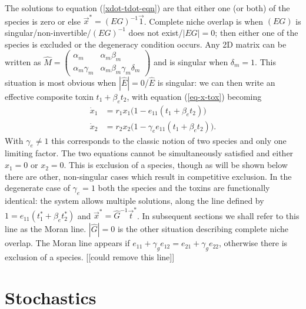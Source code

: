 \documentclass[a4paper,11pt]{article}
\numberwithin{equation}{section} %
\begin{document}
The solutions to equation (\ref{xdot-tdot-eqn}) are that either one (or both) of the species is zero or else $\vec{x}^* = (E G)^{-1}\vec{1}$. 
Complete niche overlap is when $(E G)$ is singular/non-invertible/$(E G)^{-1}$ does not exist/$|E G|=0$; then either one of the species is excluded or the degeneracy condition occurs. 
Any 2D matrix can be written as $\hat{M}=\begin{pmatrix}
\alpha_m   & \alpha_m\beta_m \\
\alpha_m\gamma_m & \alpha_m\beta_m\gamma_m\delta_m
\end{pmatrix}$ and is singular when $\delta_m=1$. 
This situation is most obvious when $|\hat{E}|=0$/$\hat{E}$ is singular: we can then write an effective composite toxin $t_1 + \beta_e t_2$, with equation (\ref{eq-x-tox}) becoming
\begin{align*}
\dot{x}_1 &= r_1 x_1\big(1 -          e_{11}\left( t_1 + \beta_e t_2 \right) \big) \\
\dot{x}_2 &= r_2 x_2\big(1 - \gamma_e e_{11}\left( t_1 + \beta_e t_2 \right) \big).
\end{align*}
With $\gamma_e\neq 1$ this corresponds to the classic notion of two species and only one limiting factor. The two equations cannot be simultaneously satisfied and either $x_1=0$ or $x_2=0$. This is exclusion of a species, though as will be shown below there are other, non-singular cases which result in competitive exclusion. 
In the degenerate case of $\gamma_e=1$ both the species and the toxins are functionally identical: the system allows multiple solutions, along the line defined by $1=e_{11}\left( t_1^* + \beta_e t_2^* \right)$ and $\vec{x}^*=\hat{G}^{-1}\vec{t}^*$. 
In subsequent sections we shall refer to this line as the Moran line. 
$|\hat{G}|=0$ is the other situation describing complete niche overlap. The Moran line appears if $e_{11}+\gamma_ge_{12}=e_{21}+\gamma_ge_{22}$, otherwise there is exclusion of a species. [[could remove this line]]








\section{Stochastics}
\end{document}
